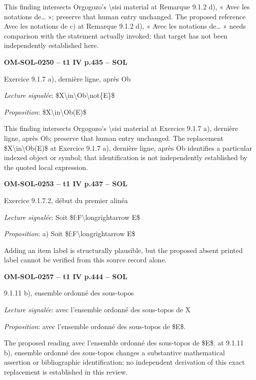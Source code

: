 This finding intersects Orgogozo's \textbackslash{}sisi material at Remarque 9.1.2 d), « Avec les notations de… »; preserve that human entry unchanged. The proposed reference Avec les notations de c) at Remarque 9.1.2 d), « Avec les notations de… » needs comparison with the statement actually invoked; that target has not been independently established here.\par
\par\noindent\textbf{OM-SOL-0250 -- t1 IV p.435 -- SOL}\par
Exercice 9.1.7 a), dernière ligne, après Ob\par
\emph{Lecture signalée}: \$X\textbackslash{}in\textbackslash{}Ob\textbackslash{}not\{E\}\$\par
\emph{Proposition}: \$X\textbackslash{}in\textbackslash{}Ob(E)\$\par
This finding intersects Orgogozo's \textbackslash{}sisi material at Exercice 9.1.7 a), dernière ligne, après Ob; preserve that human entry unchanged. The replacement \$X\textbackslash{}in\textbackslash{}Ob(E)\$ at Exercice 9.1.7 a), dernière ligne, après Ob identifies a particular indexed object or symbol; that identification is not independently established by the quoted local expression.\par
\par\noindent\textbf{OM-SOL-0253 -- t1 IV p.437 -- SOL}\par
Exercice 9.1.7.2, début du premier alinéa\par
\emph{Lecture signalée}: Soit \$f:F\textbackslash{}longrightarrow E\$\par
\emph{Proposition}: a) Soit \$f:F\textbackslash{}longrightarrow E\$\par
Adding an item label is structurally plausible, but the proposed absent printed label cannot be verified from this source record alone.\par
\par\noindent\textbf{OM-SOL-0257 -- t1 IV p.444 -- SOL}\par
9.1.11 b), ensemble ordonné des sous-topos\par
\emph{Lecture signalée}: avec l'ensemble ordonné des sous-topos de X\par
\emph{Proposition}: avec l'ensemble ordonné des sous-topos de \$E\$.\par
The proposed reading avec l'ensemble ordonné des sous-topos de \$E\$. at 9.1.11 b), ensemble ordonné des sous-topos changes a substantive mathematical assertion or bibliographic identification; no independent derivation of this exact replacement is established in this review.\par
